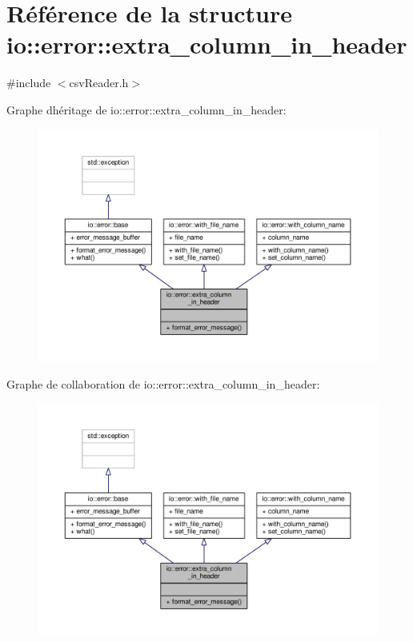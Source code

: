 \hypertarget{structio_1_1error_1_1extra__column__in__header}{}\section{Référence de la structure io\+:\+:error\+:\+:extra\+\_\+column\+\_\+in\+\_\+header}
\label{structio_1_1error_1_1extra__column__in__header}


{\ttfamily \#include $<$csv\+Reader.\+h$>$}



Graphe d\textquotesingle{}héritage de io\+:\+:error\+:\+:extra\+\_\+column\+\_\+in\+\_\+header\+:
\nopagebreak
\begin{figure}[H]
\begin{center}
\leavevmode
\includegraphics[width=350pt]{structio_1_1error_1_1extra__column__in__header__inherit__graph}
\end{center}
\end{figure}


Graphe de collaboration de io\+:\+:error\+:\+:extra\+\_\+column\+\_\+in\+\_\+header\+:
\nopagebreak
\begin{figure}[H]
\begin{center}
\leavevmode
\includegraphics[width=350pt]{structio_1_1error_1_1extra__column__in__header__coll__graph}
\end{center}
\end{figure}
